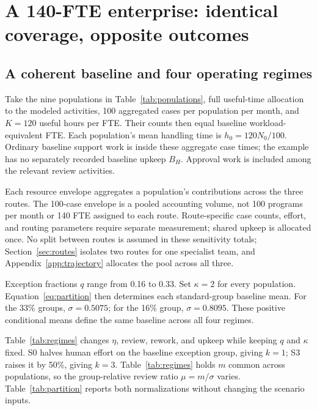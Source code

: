 \section{A 140-FTE enterprise: identical coverage, opposite outcomes}
\label{sec:example}

\subsection{A coherent baseline and four operating regimes}

Take the nine populations in Table~\ref{tab:populations}, full useful-time allocation to the modeled
activities, 100 aggregated cases per population per month, and $K=120$ useful hours per FTE. Their
counts then equal baseline workload-equivalent FTE. Each population's mean handling time is
$h_0=120N_0/100$. Ordinary baseline support work is inside these aggregate case times; the example
has no separately recorded baseline upkeep $B_H$. Approval work is included among the relevant
review activities.

Each resource envelope aggregates a population's contributions across the three routes. The 100-case envelope is a pooled accounting volume, not 100 programs per month or
140 FTE assigned to each route. Route-specific case counts, effort, and routing parameters require
separate measurement; shared upkeep is allocated once. No split between routes is assumed in these sensitivity totals; Section~\ref{sec:routes} isolates two
routes for one specialist team, and Appendix~\ref{app:trajectory} allocates the pool across all three.

Exception fractions $q$ range from 0.16 to 0.33. Set $\kappa=2$ for every population.
Equation~\eqref{eq:partition} then determines each standard-group baseline mean. For the 33\% groups,
$\sigma=0.5075$; for the 16\% group, $\sigma=0.8095$. These positive conditional means define the
same baseline across all four regimes.

Table~\ref{tab:regimes} changes $\eta$, review, rework, and upkeep while keeping $q$ and $\kappa$
fixed. S0 halves human effort on the baseline exception group, giving $k=1$; S3 raises it by 50\%,
giving $k=3$. Table~\ref{tab:regimes} holds $m$ common across populations, so the group-relative
review ratio $\mu=m/\sigma$ varies. Table~\ref{tab:partition} reports both normalizations without
changing the scenario inputs.

